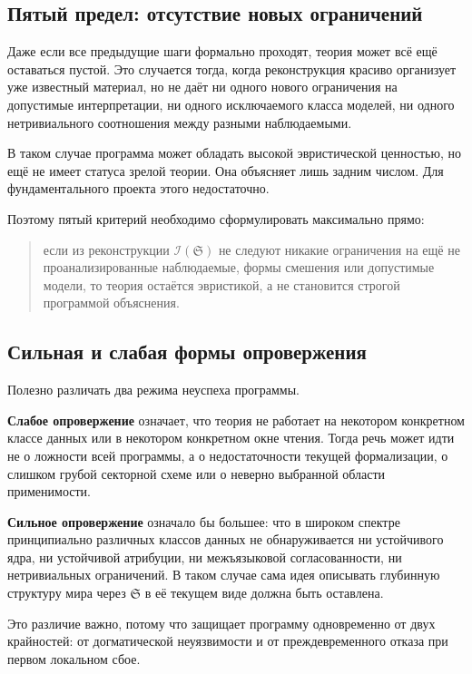 \documentclass[12pt,a4paper]{article}
\begin{document}
\subsection{Пятый предел: отсутствие новых ограничений}

Даже если все предыдущие шаги формально проходят, теория может всё ещё оставаться пустой. Это случается тогда, когда реконструкция красиво организует уже известный материал, но не даёт ни одного нового ограничения на допустимые интерпретации, ни одного исключаемого класса моделей, ни одного нетривиального соотношения между разными наблюдаемыми.

В таком случае программа может обладать высокой эвристической ценностью, но ещё не имеет статуса зрелой теории. Она объясняет лишь задним числом. Для фундаментального проекта этого недостаточно.

Поэтому пятый критерий необходимо сформулировать максимально прямо:
\begin{quote}
если из реконструкции \(\mathcal{I}(\mathfrak{S})\) не следуют никакие ограничения на ещё не проанализированные наблюдаемые, формы смешения или допустимые модели, то теория остаётся эвристикой, а не становится строгой программой объяснения.
\end{quote}

\subsection{Сильная и слабая формы опровержения}

Полезно различать два режима неуспеха программы.

\textbf{Слабое опровержение} означает, что теория не работает на некотором конкретном классе данных или в некотором конкретном окне чтения. Тогда речь может идти не о ложности всей программы, а о недостаточности текущей формализации, о слишком грубой секторной схеме или о неверно выбранной области применимости.

\textbf{Сильное опровержение} означало бы большее: что в широком спектре принципиально различных классов данных не обнаруживается ни устойчивого ядра, ни устойчивой атрибуции, ни межъязыковой согласованности, ни нетривиальных ограничений. В таком случае сама идея описывать глубинную структуру мира через \(\mathfrak{S}\) в её текущем виде должна быть оставлена.

Это различие важно, потому что защищает программу одновременно от двух крайностей: от догматической неуязвимости и от преждевременного отказа при первом локальном сбое.
\end{document}
